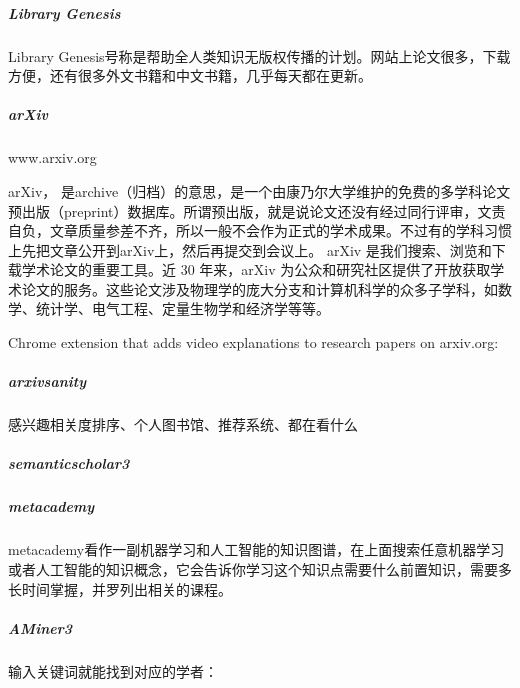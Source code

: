 \documentclass[letterpaper,11pt,english]{sphinxmanual}
\begin{document}
\subparagraph{Library Genesis}
\label{\detokenize{chapter_skill/research:library-genesis}}
Library
Genesis号称是帮助全人类知识无版权传播的计划。网站上论文很多，下载方便，还有很多外文书籍和中文书籍，几乎每天都在更新。


\subparagraph{arXiv}
\label{\detokenize{chapter_skill/research:arxiv}}
www.arxiv.org

arXiv，
是archive（归档）的意思，是一个由康乃尔大学维护的免费的多学科论文预出版（preprint）数据库。所谓预出版，就是说论文还没有经过同行评审，文责自负，文章质量参差不齐，所以一般不会作为正式的学术成果。不过有的学科习惯上先把文章公开到arXiv上，然后再提交到会议上。
arXiv 是我们搜索、浏览和下载学术论文的重要工具。近 30 年来，arXiv
为公众和研究社区提供了开放获取学术论文的服务。这些论文涉及物理学的庞大分支和计算机科学的众多子学科，如数学、统计学、电气工程、定量生物学和经济学等等。

Chrome extension that adds video explanations to research papers on
arxiv.org: 


\subparagraph{arxiv\sphinxhyphen{}sanity}
\label{\detokenize{chapter_skill/research:arxiv-sanity}}

感兴趣相关度排序、个人图书馆、推荐系统、都在看什么%
\begin{footnote}[203]\sphinxAtStartFootnote
{}
%
\end{footnote}



\subparagraph{semanticscholar3}
\label{\detokenize{chapter_skill/research:semanticscholar3}}


\subparagraph{metacademy}
\label{\detokenize{chapter_skill/research:metacademy}}

metacademy看作一副机器学习和人工智能的知识图谱，在上面搜索任意机器学习或者人工智能的知识概念，它会告诉你学习这个知识点需要什么前置知识，需要多长时间掌握，并罗列出相关的课程。


\subparagraph{AMiner3}
\label{\detokenize{chapter_skill/research:aminer3}}\label{\detokenize{chapter_skill/research:id6}}
输入关键词就能找到对应的学者： 

\end{document}
